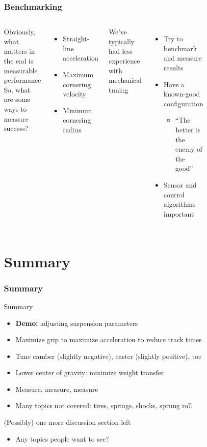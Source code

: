 \documentclass{beamer}
\begin{document}
\begin{frame}
\frametitle{Benchmarking}
\begin{columns}[t]
  Obviously, what matters in the end is measurable performance \\
  \vspace{\baselineskip}
  So, what are some ways to measure success?
   {
  \begin{itemize}
    \item Straight-line acceleration
    \item Maximum cornering velocity
    \item Minimum cornering radius
  \end{itemize}
  \vspace{\baselineskip}
  We've typically had less experience with mechanical tuning
  \begin{itemize}
    \item Try to benchmark and measure results
    \item Have a known-good configuration
    \begin{itemize}
      \item ``The better is the enemy of the good''
    \end{itemize}
    \item Sensor and control algorithms important
  \end{itemize}
  }
  \begin{figure}
    \centering
  \end{figure}
\end{columns}
\end{frame}

\section*{Summary} %

\begin{frame}
\frametitle{Summary}
Summary
\begin{itemize}
  \item \textbf{Demo:} adjusting suspension parameters
  \item Maximize grip to maximize acceleration to reduce track times
  \item Tune camber (slightly negative), caster (slightly positive), toe
  \item Lower center of gravity: minimize weight transfer
  \item Measure, measure, measure
  \vspace{\baselineskip}
  \item Many topics not covered: tires, springs, shocks, sprung roll
\end{itemize}
  \vspace{\baselineskip}
  \vspace{\baselineskip}
(Possibly) one more discussion section left
\begin{itemize}
  \item Any topics people want to see?
\end{itemize}
\end{frame}
\end{document}
